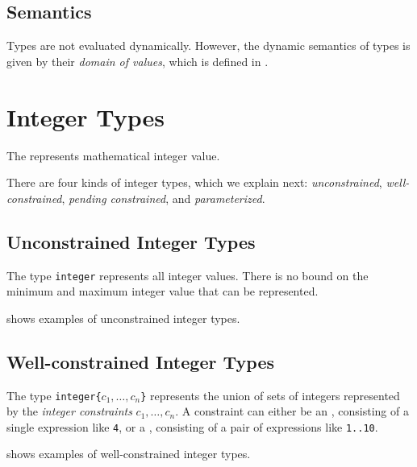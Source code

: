 \subsection{Semantics}
Types are not evaluated dynamically.
However, the dynamic semantics of types is given by their \emph{domain of values},
which is defined in .

\hypertarget{integertypeterm}{}
\section{Integer Types\label{sec:IntegerTypes}}
The \emph{\integertypeterm{}} represents mathematical integer value.

There are four kinds of integer types, which we explain next:
\emph{unconstrained}, \emph{well-constrained},
\emph{pending constrained}, and \emph{parameterized}.

\subsection{Unconstrained Integer Types}
The type \verb|integer| represents all integer values.
There is no bound on the minimum and maximum integer value that can be represented.

 shows examples of unconstrained integer types.

\subsection{Well-constrained Integer Types}
The type \texttt{integer\{$c_1,\ldots,c_n$\}} represents the
union of sets of integers represented by the \emph{integer constraints} $c_1,\ldots,c_n$.
\hypertarget{def-exactconstraintterm}{}
\hypertarget{def-rangeconstraintterm}{}
A constraint can either be an \emph{\exactconstraintterm}, consisting of a single expression like \texttt{4},
or a \emph{\rangeconstraintterm}, consisting of a pair of expressions like \texttt{1..10}.

 shows examples of well-constrained integer types.

